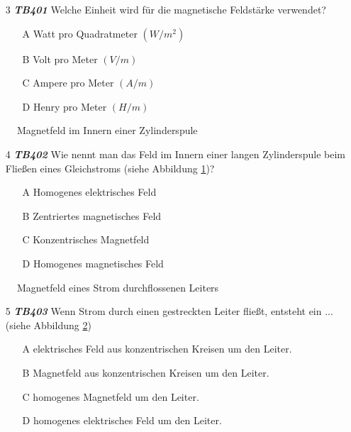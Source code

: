 \begin{enumerate} 
\itemsep1pt\parskip0pt
\item[3] \emph{\textbf{TB401}} Welche Einheit wird für die magnetische Feldstärke verwendet?
	\begin{enumerate}
	\itemsep1pt\parskip0pt
		\item[A] Watt pro Quadratmeter $(W/m^2)$
		\item[B] Volt pro Meter $(V/m)$
		\item[C] Ampere pro Meter $(A/m)$
		\item[D] Henry pro Meter $(H/m)$
	\end{enumerate}
\end{enumerate}



\begin{figure}[H]
\centering

\caption{Magnetfeld im Innern einer Zylinderspule}
\label{MfeldSpule}
\end{figure}

\begin{enumerate} 
\itemsep1pt\parskip0pt
\item[4] \emph{\textbf{TB402}} Wie nennt man das Feld im Innern einer langen Zylinderspule beim Fließen eines Gleichstroms (siehe Abbildung \ref{MfeldSpule})?
	\begin{enumerate}
	\itemsep1pt\parskip0pt
		\item[A] Homogenes elektrisches Feld
		\item[B] Zentriertes magnetisches Feld
		\item[C] Konzentrisches Magnetfeld
		\item[D] Homogenes magnetisches Feld
	\end{enumerate}
\end{enumerate}

\begin{figure}[H]
\centering

\caption{Magnetfeld eines Strom durchflossenen Leiters}
\label{MfeldLeiter}
\end{figure}

\begin{enumerate} 
\itemsep1pt\parskip0pt
\item[5] \emph{\textbf{TB403}} Wenn Strom durch einen gestreckten Leiter fließt, entsteht ein ... (siehe Abbildung \ref{MfeldLeiter})
	\begin{enumerate}
	\itemsep1pt\parskip0pt
		\item[A] elektrisches Feld aus konzentrischen Kreisen um den Leiter.
		\item[B] Magnetfeld aus konzentrischen Kreisen um den Leiter.
		\item[C] homogenes Magnetfeld um den Leiter.
		\item[D] homogenes elektrisches Feld um den Leiter.
	\end{enumerate}
\end{enumerate}

